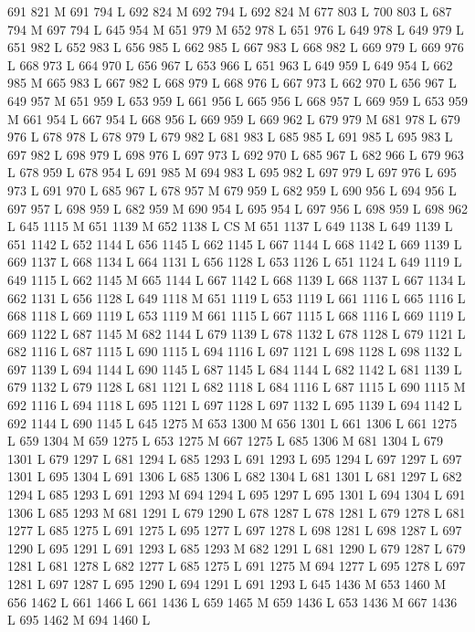 {{{{{{{{{{{{{{{{{{{{{{{{{{{691 821 M 691 794 L
692 824 M 692 794 L
692 824 M 677 803 L
700 803 L
687 794 M 697 794 L
645 954 M 651 979 M 652 978 L
651 976 L
649 978 L
649 979 L
651 982 L
652 983 L
656 985 L
662 985 L
667 983 L
668 982 L
669 979 L
669 976 L
668 973 L
664 970 L
656 967 L
653 966 L
651 963 L
649 959 L
649 954 L
662 985 M 665 983 L
667 982 L
668 979 L
668 976 L
667 973 L
662 970 L
656 967 L
649 957 M 651 959 L
653 959 L
661 956 L
665 956 L
668 957 L
669 959 L
653 959 M 661 954 L
667 954 L
668 956 L
669 959 L
669 962 L
679 979 M 681 978 L
679 976 L
678 978 L
678 979 L
679 982 L
681 983 L
685 985 L
691 985 L
695 983 L
697 982 L
698 979 L
698 976 L
697 973 L
692 970 L
685 967 L
682 966 L
679 963 L
678 959 L
678 954 L
691 985 M 694 983 L
695 982 L
697 979 L
697 976 L
695 973 L
691 970 L
685 967 L
678 957 M 679 959 L
682 959 L
690 956 L
694 956 L
697 957 L
698 959 L
682 959 M 690 954 L
695 954 L
697 956 L
698 959 L
698 962 L
645 1115 M 651 1139 M 652 1138 L
CS M
651 1137 L
649 1138 L
649 1139 L
651 1142 L
652 1144 L
656 1145 L
662 1145 L
667 1144 L
668 1142 L
669 1139 L
669 1137 L
668 1134 L
664 1131 L
656 1128 L
653 1126 L
651 1124 L
649 1119 L
649 1115 L
662 1145 M 665 1144 L
667 1142 L
668 1139 L
668 1137 L
667 1134 L
662 1131 L
656 1128 L
649 1118 M 651 1119 L
653 1119 L
661 1116 L
665 1116 L
668 1118 L
669 1119 L
653 1119 M 661 1115 L
667 1115 L
668 1116 L
669 1119 L
669 1122 L
687 1145 M 682 1144 L
679 1139 L
678 1132 L
678 1128 L
679 1121 L
682 1116 L
687 1115 L
690 1115 L
694 1116 L
697 1121 L
698 1128 L
698 1132 L
697 1139 L
694 1144 L
690 1145 L
687 1145 L
684 1144 L
682 1142 L
681 1139 L
679 1132 L
679 1128 L
681 1121 L
682 1118 L
684 1116 L
687 1115 L
690 1115 M 692 1116 L
694 1118 L
695 1121 L
697 1128 L
697 1132 L
695 1139 L
694 1142 L
692 1144 L
690 1145 L
645 1275 M 653 1300 M 656 1301 L
661 1306 L
661 1275 L
659 1304 M 659 1275 L
653 1275 M 667 1275 L
685 1306 M 681 1304 L
679 1301 L
679 1297 L
681 1294 L
685 1293 L
691 1293 L
695 1294 L
697 1297 L
697 1301 L
695 1304 L
691 1306 L
685 1306 L
682 1304 L
681 1301 L
681 1297 L
682 1294 L
685 1293 L
691 1293 M 694 1294 L
695 1297 L
695 1301 L
694 1304 L
691 1306 L
685 1293 M 681 1291 L
679 1290 L
678 1287 L
678 1281 L
679 1278 L
681 1277 L
685 1275 L
691 1275 L
695 1277 L
697 1278 L
698 1281 L
698 1287 L
697 1290 L
695 1291 L
691 1293 L
685 1293 M 682 1291 L
681 1290 L
679 1287 L
679 1281 L
681 1278 L
682 1277 L
685 1275 L
691 1275 M 694 1277 L
695 1278 L
697 1281 L
697 1287 L
695 1290 L
694 1291 L
691 1293 L
645 1436 M 653 1460 M 656 1462 L
661 1466 L
661 1436 L
659 1465 M 659 1436 L
653 1436 M 667 1436 L
695 1462 M 694 1460 L
}}}}}}}}}}}}}}}}}}}}}}}}}}}
